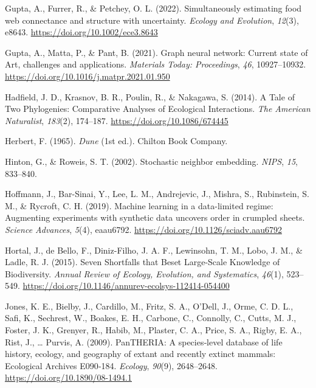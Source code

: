 \documentclass[11pt]{article}
\newlength{\cslhangindent}
\newenvironment{CSLReferences}[2] %
 {%
  \setlength{\parindent}{0pt}
  \ifodd #1 \everypar{\setlength{\hangindent}{\cslhangindent}}\ignorespaces\fi
  \ifnum #2 > 0
  \setlength{\parskip}{#2\baselineskip}
  \fi
 }%
 {}
\begin{document}
\begin{CSLReferences}{1}{0}
\leavevmode{}%
Gupta, A., Furrer, R., \& Petchey, O. L. (2022). Simultaneously
estimating food web connectance and structure with uncertainty.
\emph{Ecology and Evolution}, \emph{12}(3), e8643.
\url{https://doi.org/10.1002/ece3.8643}

\leavevmode{}%
Gupta, A., Matta, P., \& Pant, B. (2021). Graph neural network: Current
state of Art, challenges and applications. \emph{Materials Today:
Proceedings}, \emph{46}, 10927--10932.
\url{https://doi.org/10.1016/j.matpr.2021.01.950}

\leavevmode{}%
Hadfield, J. D., Krasnov, B. R., Poulin, R., \& Nakagawa, S. (2014). A
Tale of Two Phylogenies: Comparative Analyses of Ecological
Interactions. \emph{The American Naturalist}, \emph{183}(2), 174--187.
\url{https://doi.org/10.1086/674445}

\leavevmode{}%
Herbert, F. (1965). \emph{Dune} (1st ed.). Chilton Book Company.

\leavevmode{}%
Hinton, G., \& Roweis, S. T. (2002). Stochastic neighbor embedding.
\emph{NIPS}, \emph{15}, 833--840.

\leavevmode{}%
Hoffmann, J., Bar-Sinai, Y., Lee, L. M., Andrejevic, J., Mishra, S.,
Rubinstein, S. M., \& Rycroft, C. H. (2019). Machine learning in a
data-limited regime: Augmenting experiments with synthetic data uncovers
order in crumpled sheets. \emph{Science Advances}, \emph{5}(4),
eaau6792. \url{https://doi.org/10.1126/sciadv.aau6792}

\leavevmode{}%
Hortal, J., de Bello, F., Diniz-Filho, J. A. F., Lewinsohn, T. M., Lobo,
J. M., \& Ladle, R. J. (2015). Seven Shortfalls that Beset Large-Scale
Knowledge of Biodiversity. \emph{Annual Review of Ecology, Evolution,
and Systematics}, \emph{46}(1), 523--549.
\url{https://doi.org/10.1146/annurev-ecolsys-112414-054400}

\leavevmode{}%
Jones, K. E., Bielby, J., Cardillo, M., Fritz, S. A., O'Dell, J., Orme,
C. D. L., Safi, K., Sechrest, W., Boakes, E. H., Carbone, C., Connolly,
C., Cutts, M. J., Foster, J. K., Grenyer, R., Habib, M., Plaster, C. A.,
Price, S. A., Rigby, E. A., Rist, J., \ldots{} Purvis, A. (2009).
PanTHERIA: A species‐level database of life history, ecology, and
geography of extant and recently extinct mammals: Ecological Archives
E090‐184. \emph{Ecology}, \emph{90}(9), 2648--2648.
\url{https://doi.org/10.1890/08-1494.1}


\end{CSLReferences}
\end{document}
